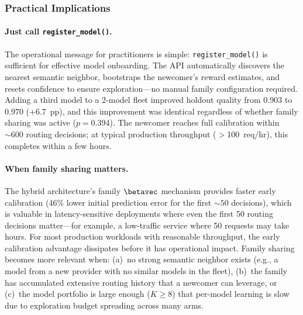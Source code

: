 \subsubsection{Practical Implications}

\paragraph{Just call \texttt{register\_model()}.}
The operational message for practitioners is simple:
\texttt{register\_model()} is sufficient for effective model onboarding.
The API automatically discovers the nearest semantic neighbor, bootstraps
the newcomer's reward estimates, and resets confidence to ensure
exploration---no manual family configuration required.
Adding a third model to a 2-model fleet improved holdout quality from
$0.903$ to $0.970$ (+6.7~pp), and this improvement was identical
regardless of whether family sharing was active ($p{=}0.394$).
The newcomer reaches full calibration within ${\sim}600$ routing
decisions; at typical production throughput ($>$100~req/hr), this
completes within a few hours.

\paragraph{When family sharing matters.}
The hybrid architecture's family $\betavec$ mechanism provides faster
early calibration (46\% lower initial prediction error for the first
${\sim}50$ decisions), which is valuable in latency-sensitive
deployments where even the first 50 routing decisions matter---for
example, a low-traffic service where 50 requests may take hours.
For most production workloads with reasonable throughput, the early
calibration advantage dissipates before it has operational impact.
Family sharing becomes more relevant when: (a)~no strong semantic
neighbor exists (e.g., a model from a new provider with no similar
models in the fleet), (b)~the family has accumulated extensive routing
history that a newcomer can leverage, or (c)~the model portfolio is
large enough ($K \geq 8$) that per-model learning is slow due to
exploration budget spreading across many arms.


